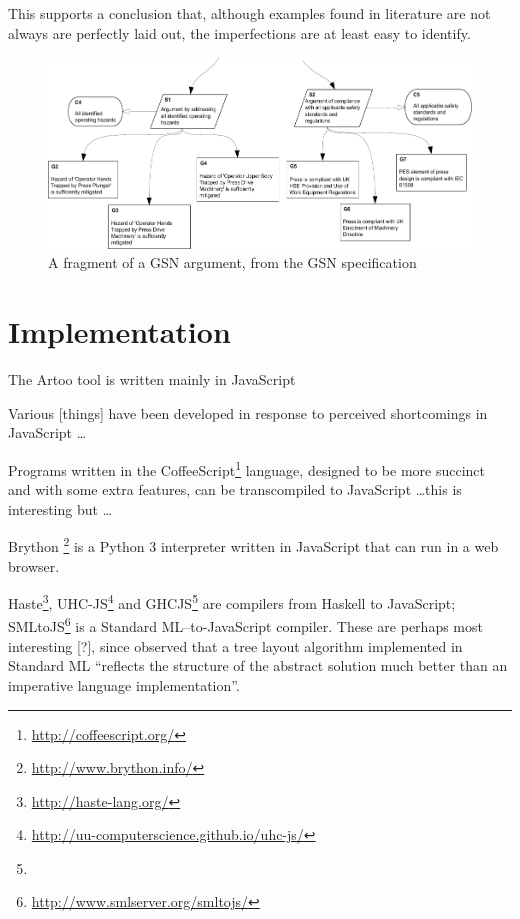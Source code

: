 This supports a conclusion that, although examples found in literature are not always are perfectly laid out, the imperfections are at least easy to identify.

\begin{figure}
    \includegraphics[width=\textwidth]{graphics/unaligned_siblings.pdf}
    \caption{A fragment of a GSN argument,
            from the GSN specification \citep[figure~42, section~2.3.6.5, pp.~34]{gsnstandard}}
    \label{fig:unalignedsiblings}
\end{figure}








\section{Implementation}

The Artoo tool is written mainly in JavaScript 

Various [things] have been developed in response to perceived shortcomings in JavaScript \ldots

Programs written in the CoffeeScript\footnote{\url{http://coffeescript.org/}} language, designed to be more succinct and with some extra features, can be transcompiled to JavaScript \ldots this is interesting but \ldots

Brython \footnote{\url{http://www.brython.info/}} is a Python 3 interpreter written in JavaScript that can run in a web browser. 

Haste\footnote{\url{http://haste-lang.org/}}, UHC-JS\footnote{\url{http://uu-computerscience.github.io/uhc-js/}}
and GHCJS\footnote{} are compilers from Haskell to JavaScript;
SMLtoJS\footnote{\url{http://www.smlserver.org/smltojs/}} is a Standard ML--to-JavaScript compiler.
These are perhaps most interesting [?], since \citet{kennedyfuntrees} observed that a tree layout algorithm implemented in Standard ML ``reflects the structure of the abstract solution much better than an imperative language implementation''.

